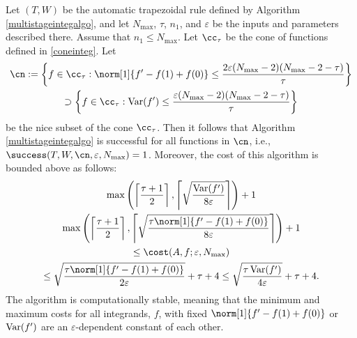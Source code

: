 \begin{theorem} \label{multistageintegthm} Let $(T,W)$ be the automatic trapezoidal rule defined by Algorithm \ref{multistageintegalgo}, and let  $N_{\max}$, $\tau$, $n_1$, and $\varepsilon$ be the inputs and parameters described there.  Assume that $n_1 \le N_{\max}$.  Let $\cc_\tau$ be the cone of functions defined in \eqref{coneinteg}.  Let
\begin{multline*}
\cn
:= \left \{ f \in \cc_\tau : \norm[1]{f'-f(1)+f(0)} \le \frac{2\varepsilon (N_{\max}-2)(N_{\max}-2 -\tau)}{\tau} \right\} \\
\supset \left \{ f \in \cc_\tau : \Var(f') \le \frac{\varepsilon (N_{\max}-2)(N_{\max}-2 -\tau)}{\tau} \right\} 
\end{multline*}
be the nice subset of the cone $\cc_\tau$.  Then it follows that Algorithm \ref{multistageintegalgo} is successful for all functions in $\cn$,  i.e.,  $\success(T,W,\cn,\varepsilon,N_{\max}) = 1$.  Moreover, the cost of this algorithm is bounded above as follows:
\begin{multline}
\max \left(\left \lceil\frac{\tau+1}{2} \right \rceil, \left \lceil \sqrt{\frac{ \Var(f')}{8\varepsilon}} \right \rceil \right) +1 \\
\max \left(\left \lceil\frac{\tau+1}{2} \right \rceil, \left \lceil \sqrt{\frac{\tau \norm[1]{f'-f(1)+f(0)}}{8\varepsilon}} \right \rceil \right) +1 \\
\le 
\cost(A,f;\varepsilon,N_{\max}) \\
\le \sqrt{\frac{\tau \norm[1]{f'-f(1)+f(0)}}{2\varepsilon}} + \tau + 4 
\le \sqrt{\frac{\tau \Var(f') }{4\varepsilon}} + \tau + 4.
\end{multline}
The algorithm is computationally stable, meaning that the minimum and maximum costs for all integrands, $f$, with fixed $\norm[1]{f'-f(1)+f(0)}$ or $\operatorname{Var}(f')$ are an $\varepsilon$-dependent constant of each other.
\end{theorem}


